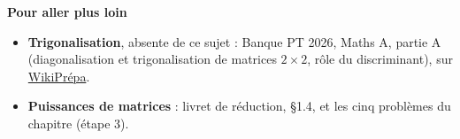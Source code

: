 \documentclass[a4paper,11pt]{article}
\numberwithin{equation}{section}
\numberwithin{figure}{section}
\numberwithin{table}{section}
\theoremstyle{enonce}
\theoremstyle{exemple}
\theoremstyle{remarque}
\newcommand{\Partie}[1]{\par\needspace{5\baselineskip}\vspace{1.1em}\noindent
  {\sffamily\bfseries\large\color{Bleu}#1}\par\vspace{2pt}{\color{Filet}\rule{\linewidth}{0.4pt}}\par\smallskip}
\begin{document}
\Partie{Pour aller plus loin}
\begin{itemize}[leftmargin=1.2em,itemsep=2pt]
\item \textbf{Trigonalisation}, absente de ce sujet : Banque PT 2026, Maths A, partie A (diagonalisation et trigonalisation de
matrices $2\times2$, rôle du discriminant), sur
\href{https://wikiprepa.fr/concours/ecrit/banque-pt_maths-a_pt_2026}{WikiPrépa}.
\item \textbf{Puissances de matrices} : livret de réduction, §1.4, et les cinq problèmes du chapitre (étape 3).
\end{itemize}
\fi
\end{document}
